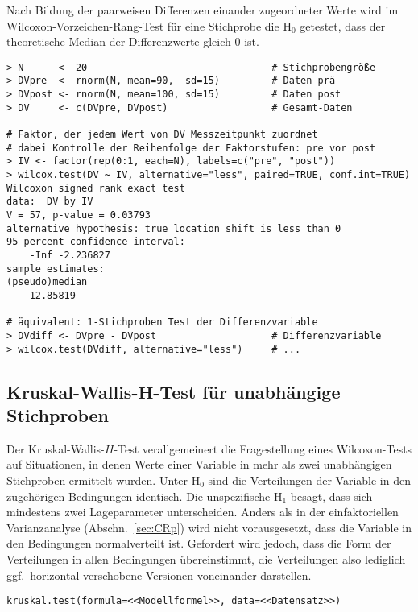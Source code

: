 Nach Bildung der paarweisen Differenzen einander zugeordneter Werte wird im Wilcoxon-Vorzeichen-Rang-Test für eine Stichprobe die $\text{H}_{0}$ getestet, dass der theoretische Median der Differenzwerte gleich $0$ ist.
\begin{lstlisting}
> N      <- 20                                # Stichprobengröße
> DVpre  <- rnorm(N, mean=90,  sd=15)         # Daten prä
> DVpost <- rnorm(N, mean=100, sd=15)         # Daten post
> DV     <- c(DVpre, DVpost)                  # Gesamt-Daten

# Faktor, der jedem Wert von DV Messzeitpunkt zuordnet
# dabei Kontrolle der Reihenfolge der Faktorstufen: pre vor post
> IV <- factor(rep(0:1, each=N), labels=c("pre", "post"))
> wilcox.test(DV ~ IV, alternative="less", paired=TRUE, conf.int=TRUE)
Wilcoxon signed rank exact test
data:  DV by IV
V = 57, p-value = 0.03793
alternative hypothesis: true location shift is less than 0
95 percent confidence interval:
    -Inf -2.236827
sample estimates:
(pseudo)median 
   -12.85819

# äquivalent: 1-Stichproben Test der Differenzvariable
> DVdiff <- DVpre - DVpost                    # Differenzvariable
> wilcox.test(DVdiff, alternative="less")     # ...
\end{lstlisting}

\subsection[Kruskal-Wallis-\texorpdfstring{$H$}{H}-Test für unabhängige Stichproben]{Kruskal-Wallis-$\bm{H}$-Test für unabhängige Stichproben}
\label{sec:kruskal}

Der Kruskal-Wallis-$H$-Test verallgemeinert die Fragestellung eines Wilcoxon-Tests auf Situationen, in denen Werte einer Variable in mehr als zwei unabhängigen Stichproben ermittelt wurden. Unter $\text{H}_{0}$ sind die Verteilungen der Variable in den zugehörigen Bedingungen identisch. Die unspezifische $\text{H}_{1}$ besagt, dass sich mindestens zwei Lageparameter unterscheiden. Anders als in der einfaktoriellen Varianzanalyse (Abschn.\ \ref{sec:CRp}) wird nicht vorausgesetzt, dass die Variable in den Bedingungen normalverteilt ist. Gefordert wird jedoch, dass die Form der Verteilungen in allen Bedingungen übereinstimmt, die Verteilungen also lediglich ggf.\ horizontal verschobene Versionen voneinander darstellen.
\begin{lstlisting}
kruskal.test(formula=<<Modellformel>>, data=<<Datensatz>>)
\end{lstlisting}

